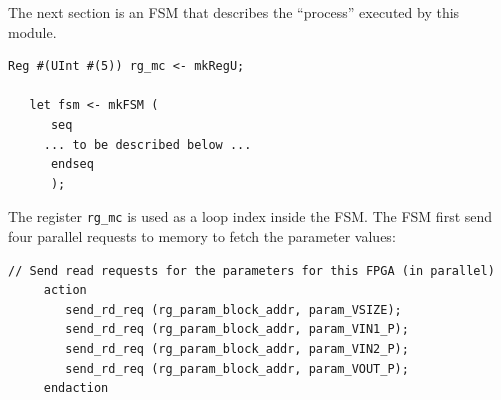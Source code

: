 \documentclass[twoside,letterpaper,11pt]{article}
\begin{document}
The next section is an FSM that describes the ``process'' executed by
this module.
\begin{Verbatim}[frame=single, label=App\_HW\_v0.bsv] 
   Reg #(UInt #(5)) rg_mc <- mkRegU;

   let fsm <- mkFSM (
      seq
	 ... to be described below ...
      endseq
      );
\end{Verbatim} 
The register \verb|rg_mc| is used as a loop index inside the FSM.  The
FSM first send four parallel requests to memory to fetch the parameter values:
\begin{Verbatim}[frame=single, label=App\_HW\_v0.bsv] 
	 // Send read requests for the parameters for this FPGA (in parallel)
	 action
	    send_rd_req (rg_param_block_addr, param_VSIZE);
	    send_rd_req (rg_param_block_addr, param_VIN1_P);
	    send_rd_req (rg_param_block_addr, param_VIN2_P);
	    send_rd_req (rg_param_block_addr, param_VOUT_P);
	 endaction
\end{Verbatim}
\end{document}
